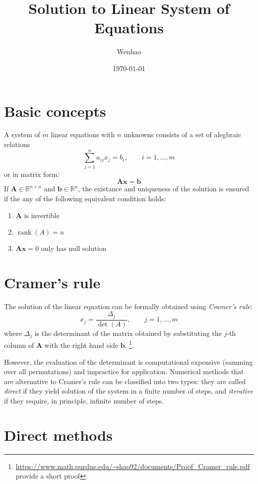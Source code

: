 \documentclass{article}
\DeclareMathOperator{\rank}{rank}
\begin{document}
\title{Solution to Linear System of Equations}
\author{Wenhao}
\date{\today}
\maketitle

\section{Basic concepts}
A system of $m$ linear equations with $n$ unknowns consists of a set of alegbraic relations
\[\sum_{j=1}^n a_{ij}x_j = b_i,\qquad i = 1, \dots, m\]
or in matrix form:
\[\mathbf{A}\mathbf{x} = \mathbf{b}\]
If $\mathbf{A}\in \mathbb{R}^{n\times n}$ and $\mathbf{b}\in \mathbb{R}^{n}$, the 
existance and uniqueness of the solution is ensured if the any of the following equivalent 
condition holds:
\begin{enumerate}
    \item $\mathbf{A}$ is invertible
    \item $\rank(A) = n$
    \item $\mathbf{A}\mathbf{x} =0$ only has null solution
\end{enumerate}

\section{Cramer's rule}
The solution of the linear equation can be formally obtained using \emph{Cramer's rule}:
\[x_j = \frac{\Delta_j}{\det(A)},\qquad j = 1, \dots, m\]
where $\Delta_j$ is the determinant of the matrix obtained by substituting the $j$-th 
column of $\mathbf{A}$ with the right hand side $\mathbf{b}$.
\footnote{\url{https://www.math.purdue.edu/~shao92/documents/Proof_Cramer_rule.pdf} provide a short proof}.

However, the evaluation of the determinant is computational expensive (summing over all 
permutations) and impractice for application. Numerical methods that are alternative to 
Cramer's rule can be classified into two types:
they are called \emph{direct} if they yield solution of the system in a finite number of 
steps, and \emph{iterative} if they require, in principle, infinite number of steps.

\section{Direct methods}
\end{document}
